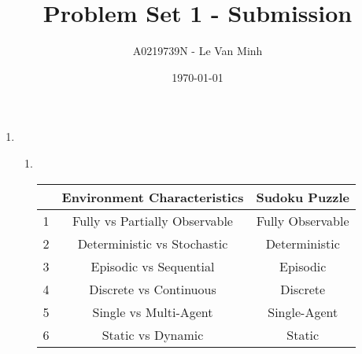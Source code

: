 \documentclass{article}
\title{Problem Set 1 - Submission}
\author{A0219739N - Le Van Minh}
\date{\today}
\begin{document}
\maketitle
\begin{enumerate}[leftmargin=\labelsep]
  \item \ \\
  \begin{enumerate}[leftmargin=\labelsep]
    \item \ \\
    \begin{center}
     \begin{tabular}{ |c|c|c| }
     \hline
      & \textbf{Environment Characteristics} & \textbf{Sudoku Puzzle} \\
     \hline
     1  & Fully vs Partially Observable & Fully Observable  \\
     \hline
     2  & Deterministic vs Stochastic & Deterministic \\
     \hline
     3  & Episodic vs Sequential & Episodic \\
     \hline
     4  & Discrete vs Continuous & Discrete \\
     \hline
     5  & Single vs Multi-Agent & Single-Agent \\
     \hline
     6  & Static vs Dynamic & Static \\
     \hline 
     \end{tabular}
    \end{center}


\end{enumerate}
\end{enumerate}
\end{document}
